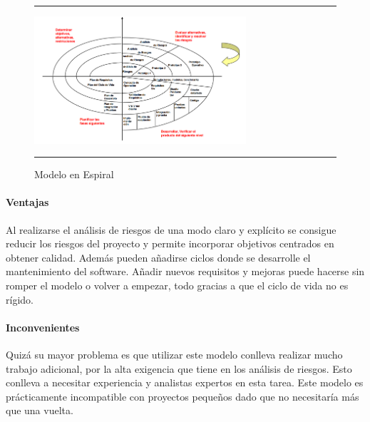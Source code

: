 \begin{figure}[h]
\hrule\smallskip
\begin{center}
\includegraphics[width=0.7\textwidth]{fig/espiral.png}
\end{center}
\caption{Modelo en Espiral}
\label{fig:espiral}
\hrule
\end{figure}

\paragraph{Ventajas} Al realizarse el análisis de riesgos de una modo
claro y explícito se consigue reducir los riesgos del proyecto y
permite incorporar objetivos centrados en obtener calidad. Además
pueden añadirse ciclos donde se desarrolle el mantenimiento del
software. Añadir nuevos requisitos y mejoras puede hacerse sin romper
el modelo o volver a empezar, todo gracias a que el ciclo de vida no
es rígido.

\paragraph{Inconvenientes} Quizá su mayor problema es que utilizar
este modelo conlleva realizar mucho trabajo adicional, por la alta
exigencia que tiene en los análisis de riesgos. Esto conlleva a
necesitar experiencia y analistas expertos en esta tarea. Este modelo
es prácticamente incompatible con proyectos pequeños dado que no
necesitaría más que una vuelta.
